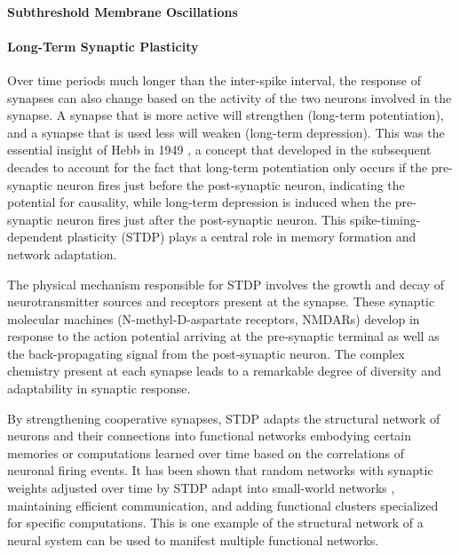 \paragraph{\label{sec:subthreshold_membrane_oscillations}Subthreshold Membrane Oscillations}

\paragraph{\label{sec:long_term_plasticity}Long-Term Synaptic Plasticity}
Over time periods much longer than the inter-spike interval, the response of synapses can also change based on the activity of the two neurons involved in the synapse. A synapse that is more active will strengthen (long-term potentiation), and a synapse that is used less will weaken (long-term depression). This was the essential insight of Hebb in 1949 \cite{he1949}, a concept that developed in the subsequent decades \cite{bipo1998,somi2000} to account for the fact that long-term potentiation only occurs if the pre-synaptic neuron fires just before the post-synaptic neuron, indicating the potential for causality, while long-term depression is induced when the pre-synaptic neuron fires just after the post-synaptic neuron. This spike-timing-dependent plasticity (STDP) \cite{mage2012} plays a central role in memory formation and network adaptation. 

The physical mechanism responsible for STDP involves the growth and decay of neurotransmitter sources and receptors present at the synapse. These synaptic molecular machines (N-methyl-D-aspartate receptors, NMDARs) develop in response to the action potential arriving at the pre-synaptic terminal as well as the back-propagating signal from the post-synaptic neuron. The complex chemistry present at each synapse leads to a remarkable degree of diversity and adaptability in synaptic response.

By strengthening cooperative synapses, STDP adapts the structural network of neurons and their connections into functional networks embodying certain memories or computations learned over time based on the correlations of neuronal firing events. It has been shown that random networks with synaptic weights adjusted over time by STDP adapt into small-world networks \cite{shki2006}, maintaining efficient communication, and adding functional clusters specialized for specific computations. This is one example of the structural network of a neural system can be used to manifest multiple functional networks.

